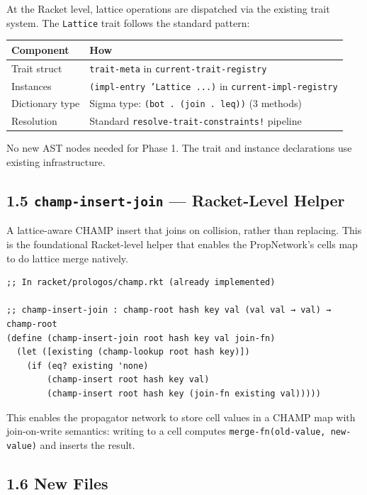 \documentclass[11pt]{article}
\begin{document}
At the Racket level, lattice operations are dispatched via the existing trait
system. The \texttt{Lattice} trait follows the standard pattern:

\begin{center}
\begin{tabular}{ll}
Component & How\\
\hline
Trait struct & \texttt{trait-meta} in \texttt{current-trait-registry}\\
Instances & \texttt{(impl-entry 'Lattice ...)} in \texttt{current-impl-registry}\\
Dictionary type & Sigma type: \texttt{(bot . (join . leq))} (3 methods)\\
Resolution & Standard \texttt{resolve-trait-constraints!} pipeline\\
\end{tabular}
\end{center}

No new AST nodes needed for Phase 1. The trait and instance declarations
use existing infrastructure.
\subsection{1.5 \texttt{champ-insert-join} — Racket-Level Helper}
\label{sec:orge439b27}

A lattice-aware CHAMP insert that joins on collision, rather than replacing.
This is the foundational Racket-level helper that enables the PropNetwork's
cells map to do lattice merge natively.

\begin{verbatim}
;; In racket/prologos/champ.rkt (already implemented)

;; champ-insert-join : champ-root hash key val (val val → val) → champ-root
(define (champ-insert-join root hash key val join-fn)
  (let ([existing (champ-lookup root hash key)])
    (if (eq? existing 'none)
        (champ-insert root hash key val)
        (champ-insert root hash key (join-fn existing val)))))
\end{verbatim}

This enables the propagator network to store cell values in a CHAMP map
with join-on-write semantics: writing to a cell computes
\texttt{merge-fn(old-value, new-value)} and inserts the result.
\subsection{1.6 New Files}
\label{sec:org180b890}
\end{document}
